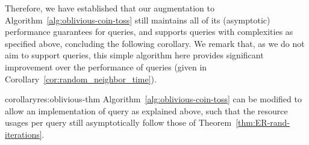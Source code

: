 Therefore, we have established that our augmentation to Algorithm~\ref{alg:oblivious-coin-toss} still maintains all of its (asymptotic) performance guarantees for  queries, and supports  queries with complexities as specified above, concluding the following corollary.
We remark that, as we do not aim to support  queries, this simple algorithm here provides significant improvement over the performance of  queries (given in Corollary~\ref{cor:random_neighbor_time}).

\begin{restatable}{corollary}{res:oblivious-thm}\label{cor:oblivious-alg}
Algorithm~\ref{alg:oblivious-coin-toss} can be modified to allow an implementation of  query as explained above, such that the resource usages per query still asymptotically follow those of Theorem~\ref{thm:ER-rand-iterations}.
\end{restatable} 



